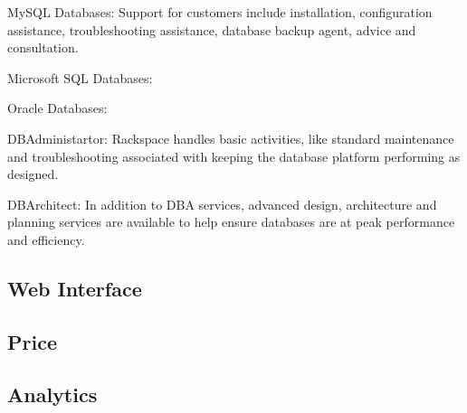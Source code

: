 MySQL Databases: Support for customers include installation, configuration assistance, troubleshooting assistance, database backup agent, advice and consultation. 

Microsoft SQL Databases:

Oracle Databases: 

DBAdministartor: Rackspace handles basic activities, like standard maintenance and troubleshooting associated with keeping the database platform performing as designed.

DBArchitect: In addition to DBA services, advanced design, architecture and planning services are available to help ensure databases are at peak performance and efficiency. 

\subsection{Web Interface}

\subsection{Price}

\subsection{Analytics}